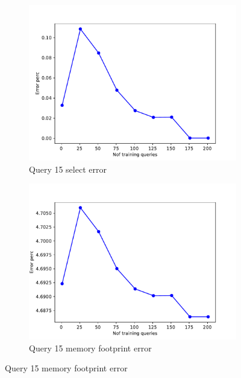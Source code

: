 \begin{figure}[!htb]
    \begin{subfigure}[t]{0.5\textwidth}
      \includegraphics[scale=0.4]{figs/tpch10/tpch10_sel15_error.pdf}
      \caption{Query 15 select error}
      \label{fig:tpch_sel15}
    \end{subfigure}
    \begin{subfigure}[t]{0.5\textwidth}
      \includegraphics[scale=0.4]{figs/tpch10/tpch10_q15_memerror.pdf}
      \caption{Query 15 memory footprint error}
      \label{fig:tpch_mem15}
    \end{subfigure}



\end{figure}
